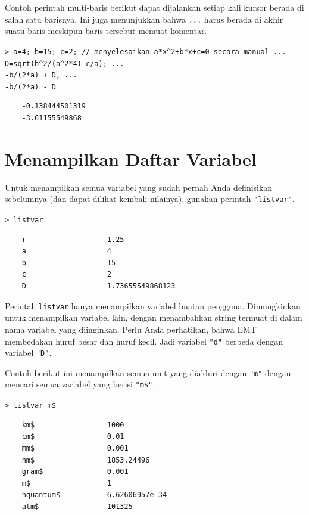 \documentclass[11pt, a4paper]{article}
\newcommand{\emtcmd}[1]{\noindent\texttt{\textcolor{emtcommand}{>}\ #1}\par\smallskip}
\begin{document}
Contoh perintah multi-baris berikut dapat dijalankan setiap kali kursor berada di salah satu barisnya. Ini juga menunjukkan bahwa \texttt{...} harus berada di akhir suatu baris meskipun baris tersebut memuat komentar.

\emtcmd{a=4; b=15; c=2; \textcolor{emtcomment}{// menyelesaikan a*x\^{}2+b*x+c=0 secara manual} ... \\
\hspace*{1em} D=sqrt(b\^{}2/(a\^{}2*4)-c/a); ... \\
\hspace*{1em} -b/(2*a) + D, ... \\
\hspace*{1em} -b/(2*a) - D}
\begin{verbatim}
    -0.138444501319
    -3.61155549868
\end{verbatim}

\section*{Menampilkan Daftar Variabel}

Untuk menampilkan semua variabel yang sudah pernah Anda definisikan sebelumnya (dan dapat dilihat kembali nilainya), gunakan perintah \texttt{"listvar"}.

\emtcmd{listvar}
\begin{verbatim}
    r                   1.25
    a                   4
    b                   15
    c                   2
    D                   1.73655549868123
\end{verbatim}

Perintah \texttt{listvar} hanya menampilkan variabel buatan pengguna. Dimungkinkan untuk menampilkan variabel lain, dengan menambahkan string termuat di dalam nama variabel yang diinginkan. Perlu Anda perhatikan, bahwa EMT membedakan huruf besar dan huruf kecil. Jadi variabel \texttt{"d"} berbeda dengan variabel \texttt{"D"}.

Contoh berikut ini menampilkan semua unit yang diakhiri dengan \texttt{"m"} dengan mencari semua variabel yang berisi \texttt{"m\$"}.

\emtcmd{listvar m\$}
\begin{verbatim}
    km$                 1000
    cm$                 0.01
    mm$                 0.001
    nm$                 1853.24496
    gram$               0.001
    m$                  1
    hquantum$           6.62606957e-34
    atm$                101325
\end{verbatim}
\end{document}
